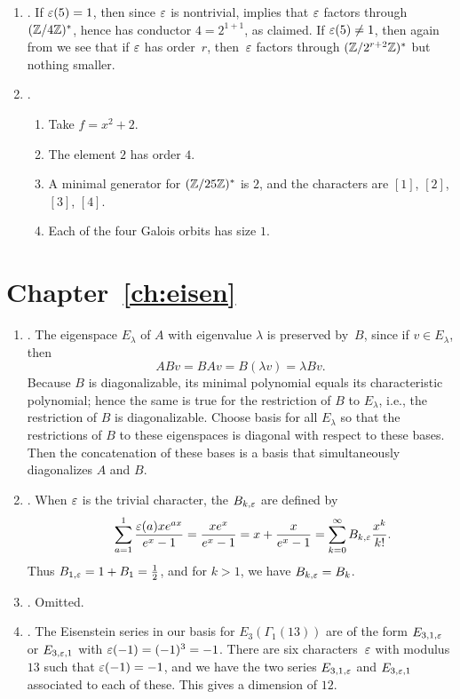 \begin{enumerate}
\item {}.
If $\varepsilon(5)=1$, then since $\varepsilon$ is 
nontrivial,  implies
that $\varepsilon$ factors through $(\mathbb{Z}/4\mathbb{Z})^*$, hence has
conductor $4 = 2^{1 + 1}$, as claimed. 
If $\varepsilon(5)\neq 1$, then again from 
we see that if $\varepsilon$ has order~$r$, then~$\varepsilon$ 
factors through $(\mathbb{Z}/2^{r+2}\mathbb{Z})^*$ but nothing smaller. 

\item {}.
\begin{enumerate}
\item Take $f=x^2+2$.
\item The element $2$ has order $4$.
\item A minimal generator for $(\mathbb{Z}/25\mathbb{Z})^*$ is $2$,
and the characters are $[1]$, $[2]$, $[3]$, $[4]$.
\item Each of the four Galois orbits has size $1$.
\end{enumerate}


\end{enumerate}

\section{Chapter~\ref{ch:eisen}}

\begin{enumerate}
\item {}.
The eigenspace $E_{\lambda}$ of $A$ with eigenvalue $\lambda$ is
preserved by~$B$, since if $v\in E_{\lambda}$, then 
$$ABv = BAv = B(\lambda v) = \lambda B v.$$
Because $B$ is diagonalizable, its minimal polynomial
equals its characteristic polynomial; hence the
same is true for the restriction of $B$ to $E_{\lambda}$,
i.e., the restriction of $B$ is diagonalizable.  
Choose basis for all $E_{\lambda}$ so that the
restrictions of $B$ to these eigenspaces
is diagonal with respect to these bases. Then
the concatenation of these bases is a basis that
simultaneously diagonalizes $A$ and $B$.

\item {}.
When $\varepsilon$ is the trivial character, the
$B_{k,\varepsilon}$ are defined by
$$
  \qquad \sum_{a=1}^{1} \frac{\varepsilon(a) x e^{ax}}{e^{x}-1}
   = \frac{x e^x}{e^x - 1} = x + \frac{x}{e^x - 1}
   = \sum_{k=0}^{\infty} B_{k,\varepsilon} \frac{x^k}{k!}.
$$
Thus $B_{1,\varepsilon} = 1 + B_1 = \frac{1}{2}$,
and for $k>1$, we have $B_{k,\varepsilon} = B_k$.

\item {}. Omitted.

\item {}.
The  Eisenstein series in our
basis for $E_3(\Gamma_1(13))$ are of 
the form $E_{3,1,\varepsilon}$ or $E_{3,\varepsilon,1}$
with $\varepsilon(-1)=(-1)^3=-1$.
There are six characters~$\varepsilon$
with modulus $13$ such that  $\varepsilon(-1)=-1$,
and we have the two series $E_{3,1,\varepsilon}$ and
$E_{3,\varepsilon,1}$ associated to each of these.
This gives a dimension of $12$.


\end{enumerate}

